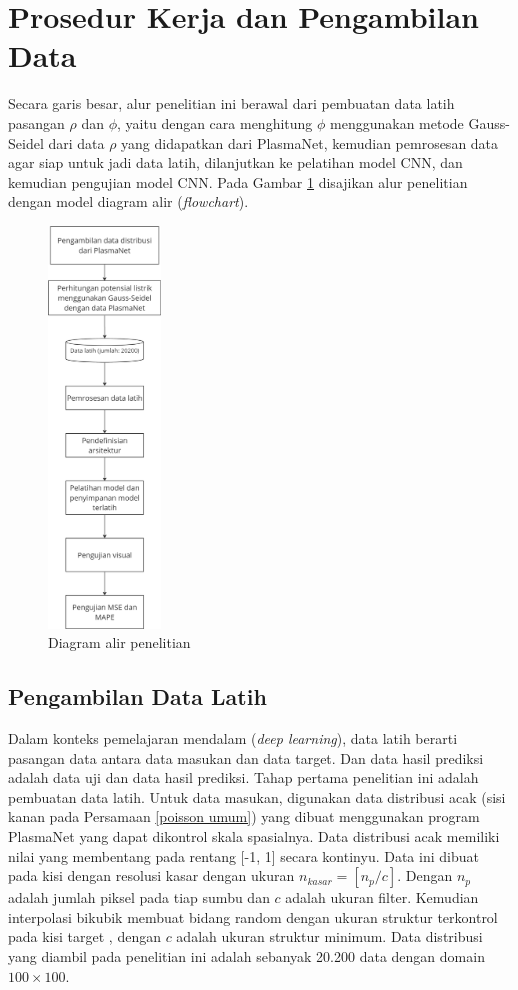 \section{Prosedur Kerja dan Pengambilan Data}
Secara garis besar, alur penelitian ini berawal dari pembuatan data latih pasangan $\rho$ dan $\phi$, yaitu dengan cara menghitung $\phi$ menggunakan metode Gauss-Seidel dari data $\rho$ yang didapatkan dari PlasmaNet, kemudian pemrosesan data agar siap untuk jadi data latih, dilanjutkan ke pelatihan model CNN, dan kemudian pengujian model CNN. Pada Gambar \ref{flowchart} disajikan alur penelitian dengan model diagram alir (\emph{flowchart}).

\begin{figure}[h!]\label{flowchart}
    \centering
    \includegraphics[width=3cm, scale=0.5]{gambar/flowchart2.jpg}
    \caption{Diagram alir penelitian}
    \label{flowchart}
\end{figure}

\subsection{Pengambilan Data Latih}\label{data_latih}
Dalam konteks pemelajaran mendalam (\emph{deep learning}), data latih berarti pasangan data antara data masukan dan data target. Dan data hasil prediksi adalah data uji dan data hasil prediksi. Tahap pertama penelitian ini adalah pembuatan data latih. Untuk data masukan, digunakan data distribusi acak (sisi kanan pada Persamaan \eqref{poisson umum}) yang dibuat menggunakan program PlasmaNet yang dapat dikontrol skala spasialnya. Data distribusi acak memiliki nilai yang membentang pada rentang [-1, 1] secara kontinyu. Data ini dibuat pada kisi dengan resolusi kasar dengan ukuran $n_{kasar} = [n_p/c]$. Dengan $n_p$ adalah jumlah piksel pada tiap sumbu dan $c$ adalah ukuran filter. Kemudian interpolasi bikubik membuat bidang random dengan ukuran struktur terkontrol pada kisi target \citep{cheng_illarramendi_bauerheim_cuenot_2021}, dengan $c$ adalah ukuran struktur minimum. Data distribusi yang diambil pada penelitian ini adalah sebanyak 20.200 data dengan domain $100 \times 100$. 

